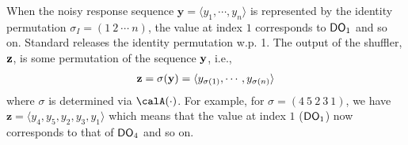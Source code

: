 When the noisy response sequence $\mathbf{y}=\langle y_1, \cdots, y_n\rangle$ is represented by the identity permutation $\sigma_{I}=(1 \: 2 \: \cdots \: n)$, the value at index $1$ corresponds to $\textsf{DO}_1$ and so on. Standard \ldp releases the identity permutation w.p. 1. The output of the shuffler, $\bf{z}$, is some permutation of the sequence $\bf{y}$, i.e.,
\begin{align*}
\mathbf{z}=\sigma(\mathbf{y})=
\langle y_{\sigma(1)},\cdots,y_{\sigma(n)}\rangle
\end{align*}
where $\sigma$ is determined via $\calA(\cdot)$. For example, for $\sigma=(4 \: 5\: 2 \:3 \: 1)$, we have $\mathbf{z}=\langle y_4, y_5, y_2, y_3, y_1\rangle$ which means that the value at index $1$ ($\textsf{DO}_1$) now corresponds to that of $\textsf{DO}_4$ and so on.

   \vspace{-0.1cm}
